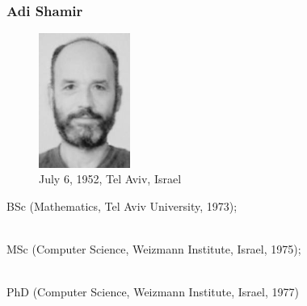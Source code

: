 \documentclass[slidestop,compress,mathserif]{beamer}
\begin{document}
\begin{frame}
  \frametitle{Adi Shamir}
  \begin{multicols}{2}
    \begin{minipage}[c]{0.5\textwidth}
      \begin{figure}[H]
        \includegraphics[width=3cm]{Shamir.jpg}
        \caption{July 6, 1952, Tel Aviv, Israel}
      \end{figure}
    \end{minipage}

    BSc (Mathematics, Tel Aviv University, 1973); 
   
    ~\\ 
    
    MSc (Computer Science, Weizmann Institute, Israel, 1975); 
    
    ~\\

    PhD (Computer Science, Weizmann Institute, Israel, 1977)    
  \end{multicols}
  
\end{frame}
\end{document}
